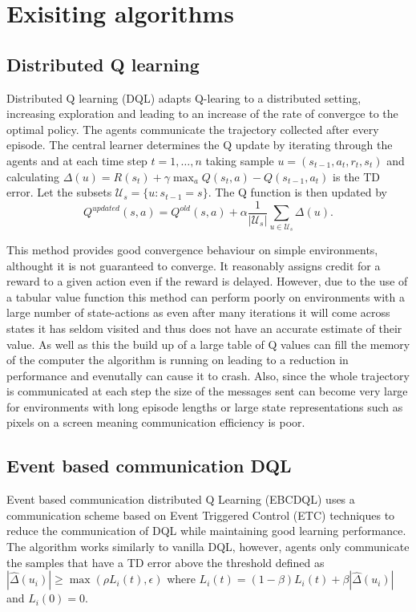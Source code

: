 \section{Exisiting algorithms}
\subsection{Distributed Q learning}
Distributed Q learning (DQL) adapts Q-learing to a distributed setting, increasing exploration and leading to an increase of the rate of convergce to the optimal policy. 
The agents communicate the trajectory collected after every episode.
The central learner determines the Q update by iterating through the agents and at each time step $t=1,\dots,n$ taking sample $u = (s_{t-1},a_t,r_t,s_t)$  and calculating $\Delta(u) = R(s_t) + \gamma \max_a Q(s_t,a) - Q(s_{t-1},a_t)$ is the TD error.
Let the subsets $\mathcal{U}_s = \{u: s_{t-1}=s\}$.
The Q function is then updated by 
\begin{equation*}
    Q^{updated}(s,a) = Q^{old}(s,a) + \alpha \frac{1}{|\mathcal{U}_s|} \sum_{u \in \mathcal{U}_s} \Delta(u).
\end{equation*}

This method provides good convergence behaviour on simple environments, althought it is not guaranteed to converge. It reasonably assigns credit for a reward to a given action even if the reward is delayed. However, due to the use of a tabular value function this method can perform poorly on environments with a large number of state-actions as even after many iterations it will come across states it has seldom visited and thus does not have an accurate estimate of their value. As well as this the build up of a large table of Q values can fill the memory of the computer the algorithm is running on leading to a reduction in performance and evenutally can cause it to crash.
Also, since the whole trajectory is communicated at each step the size of the messages sent can become very large for environments with long episode lengths or large state representations such as pixels on a screen meaning communication efficiency is poor.

\subsection{Event based communication DQL}
Event based communication distributed Q Learning (EBCDQL) \cite{EBCDQL} uses a communication scheme based on Event Triggered Control (ETC) techniques to reduce the communication of DQL while maintaining good learning performance.
The algorithm works similarly to vanilla DQL, however, agents only communicate the samples that have a TD error above the threshold defined as 
$|\hat{\Delta}(u_i)| \geq \max(\rho L_i(t), \epsilon)$ where $L_i(t) = (1-\beta)L_i(t)+ \beta |\hat{\Delta}(u_i)|$ and $L_i(0)=0$.

